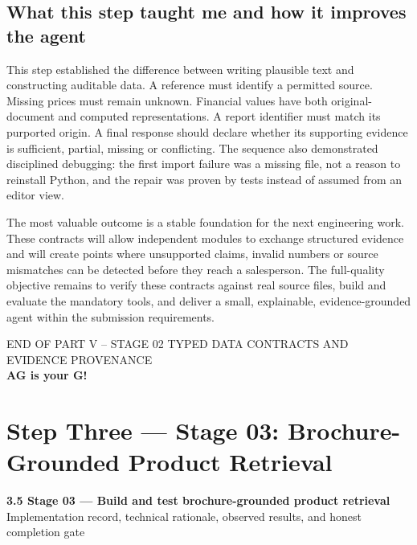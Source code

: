 \documentclass[11pt,a4paper]{article}
\begin{document}
\subsection{What this step taught me and how it improves the agent}
This step established the difference between writing plausible text and constructing auditable data. A reference must identify a permitted source. Missing prices must remain unknown. Financial values have both original-document and computed representations. A report identifier must match its purported origin. A final response should declare whether its supporting evidence is sufficient, partial, missing or conflicting. The sequence also demonstrated disciplined debugging: the first import failure was a missing file, not a reason to reinstall Python, and the repair was proven by tests instead of assumed from an editor view.

The most valuable outcome is a stable foundation for the next engineering work. These contracts will allow independent modules to exchange structured evidence and will create points where unsupported claims, invalid numbers or source mismatches can be detected before they reach a salesperson. The full-quality objective remains to verify these contracts against real source files, build and evaluate the mandatory tools, and deliver a small, explainable, evidence-grounded agent within the submission requirements.

\vspace{4mm}
\begin{center}
{\sffamily\color{Gray}\footnotesize END OF PART V -- STAGE 02 TYPED DATA CONTRACTS AND EVIDENCE PROVENANCE}\\[2mm]
{\sffamily\bfseries\color{Navy}AG is your G!}
\end{center}

\clearpage
\section{Step Three --- Stage 03: Brochure-Grounded Product Retrieval}
\begin{center}
{\sffamily\large\bfseries\color{Blue}3.5 Stage 03 --- Build and test brochure-grounded product retrieval}\\[2mm]
{\sffamily\color{Gray}\small Implementation record, technical rationale, observed results, and honest completion gate}
\end{center}
\end{document}
